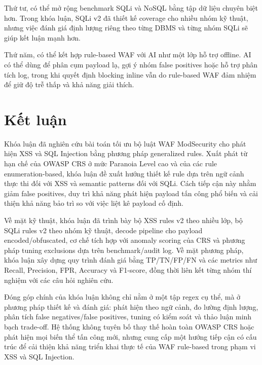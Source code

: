 Thứ tư, có thể mở rộng benchmark SQLi và NoSQL bằng tập dữ liệu chuyên biệt hơn. Trong khóa luận, SQLi v2 đã thiết kế coverage cho nhiều nhóm kỹ thuật, nhưng việc đánh giá định lượng riêng theo từng DBMS và từng nhóm SQLi sẽ giúp kết luận mạnh hơn.

Thứ năm, có thể kết hợp rule-based WAF với AI như một lớp hỗ trợ offline. AI có thể dùng để phân cụm payload lạ, gợi ý nhóm false positives hoặc hỗ trợ phân tích log, trong khi quyết định blocking inline vẫn do rule-based WAF đảm nhiệm để giữ độ trễ thấp và khả năng giải thích.

\section{Kết luận}
\label{sec:conclusion}

Khóa luận đã nghiên cứu bài toán tối ưu bộ luật WAF ModSecurity cho phát hiện XSS và SQL Injection bằng phương pháp generalized rules. Xuất phát từ hạn chế của OWASP CRS ở mức Paranoia Level cao và của các rule enumeration-based, khóa luận đề xuất hướng thiết kế rule dựa trên ngữ cảnh thực thi đối với XSS và semantic patterns đối với SQLi. Cách tiếp cận này nhằm giảm false positives, duy trì khả năng phát hiện payload tấn công phổ biến và cải thiện khả năng bảo trì so với việc liệt kê payload cố định.

Về mặt kỹ thuật, khóa luận đã trình bày bộ XSS rules v2 theo nhiều lớp, bộ SQLi rules v2 theo nhóm kỹ thuật, decode pipeline cho payload encoded/obfuscated, cơ chế tích hợp với anomaly scoring của CRS và phương pháp tuning exclusions dựa trên benchmark/audit log. Về mặt phương pháp, khóa luận xây dựng quy trình đánh giá bằng TP/TN/FP/FN và các metrics như Recall, Precision, FPR, Accuracy và F1-score, đồng thời liên kết từng nhóm thí nghiệm với các câu hỏi nghiên cứu.

Đóng góp chính của khóa luận không chỉ nằm ở một tập regex cụ thể, mà ở phương pháp thiết kế và đánh giá: phát hiện theo ngữ cảnh, đo lường định lượng, phân tích false negatives/false positives, tuning có kiểm soát và thảo luận minh bạch trade-off. Hệ thống không tuyên bố thay thế hoàn toàn OWASP CRS hoặc phát hiện mọi biến thể tấn công mới, nhưng cung cấp một hướng tiếp cận có cấu trúc để cải thiện khả năng triển khai thực tế của WAF rule-based trong phạm vi XSS và SQL Injection.

